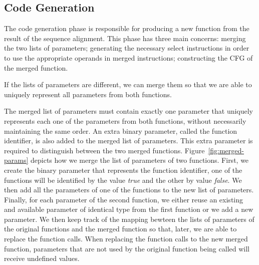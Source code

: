 \subsection{Code Generation}

The code generation phase is responsible for producing a new function from the
result of the sequence alignment.
This phase has three main concerns: merging the two lists of parameters;
generating the necessary select instructions in order to
use the appropriate operands in merged instructions;
constructing the CFG of the merged function.


If the lists of parameters are different, we can merge them so that we are able
to uniquely represent all parameters from both functions.

The merged list of parameters must contain exactly one parameter that uniquely
represents each one of the parameters from both functions, without necessarily
maintaining the same order.
An extra binary parameter, called the function identifier, is also added to the
merged list of parameters.
This extra parameter is required to distinguish between the two merged functions.
Figure~\ref{fig:merged-params} depicts how we merge the list of parameters of
two functions.
First, we create the binary parameter that represents the function identifier, 
one of the functions will be identified by the value \textit{true} and the other
by value \textit{false}.
We then add all the parameters of one of the functions to the new list of
parameters.
Finally, for each parameter of the second function, we either reuse an existing
and available parameter of identical type from the first function or we add a
new parameter.  
We then keep track of the mapping bewteen the lists of parameters of the
original functions and the merged function so that, later, we are able to
replace the function calls.
When replacing the function calls to the new merged function, parameters that
are not used by the original function being called will receive undefined values.

